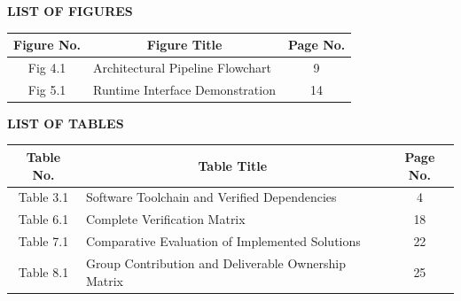 \documentclass[12pt,a4paper]{report}
\begin{document}
\newpage

\begin{center}
    {\fontsize{14}{16}\bfseries LIST OF FIGURES}\\[1.5em]
\end{center}

\begin{table}[h!]
\centering
\fontsize{9.5}{12}\selectfont
\begin{tabular}{|c|p{4.8in}|c|}
\hline
\rowcolor{tableheader}
\textbf{Figure No.} & \multicolumn{1}{c|}{\textbf{Figure Title}} & \textbf{Page No.} \\
\hline
Fig 4.1 & Architectural Pipeline Flowchart & 9 \\
\hline
Fig 5.1 & Runtime Interface Demonstration & 14 \\
\hline
\end{tabular}
\end{table}

\vspace{1.5em}

\begin{center}
    {\fontsize{14}{16}\bfseries LIST OF TABLES}\\[1.5em]
\end{center}

\begin{table}[h!]
\centering
\fontsize{9.5}{12}\selectfont
\begin{tabular}{|c|p{4.8in}|c|}
\hline
\rowcolor{tableheader}
\textbf{Table No.} & \multicolumn{1}{c|}{\textbf{Table Title}} & \textbf{Page No.} \\
\hline
Table 3.1 & Software Toolchain and Verified Dependencies & 4 \\
\hline
Table 6.1 & Complete Verification Matrix & 18 \\
\hline
Table 7.1 & Comparative Evaluation of Implemented Solutions & 22 \\
\hline
Table 8.1 & Group Contribution and Deliverable Ownership Matrix & 25 \\
\hline
\end{tabular}
\end{table}
\end{document}
